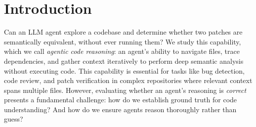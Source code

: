 \documentclass[]{meta}
\begin{document}
\maketitle

\section{Introduction}
Can an LLM agent explore a codebase and determine whether two patches are semantically equivalent, without ever running them? We study this capability, which we call \emph{agentic code reasoning}: an agent's ability to navigate files, trace dependencies, and gather context iteratively to perform deep semantic analysis without executing code. This capability is essential for tasks like bug detection, code review, and patch verification in complex repositories where relevant context spans multiple files.
However, evaluating whether an agent's reasoning is \emph{correct} presents a fundamental challenge: how do we establish ground truth for code understanding? And how do we ensure agents reason thoroughly rather than guess?
\end{document}
